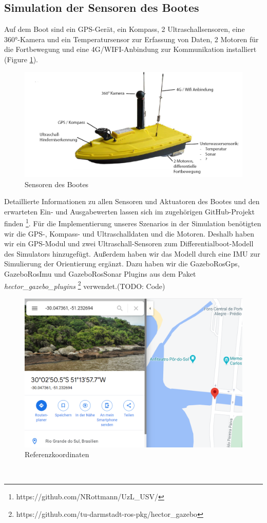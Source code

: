 \documentclass[conference]{IEEEtran}
\begin{document}
\subsection{Simulation der Sensoren des Bootes}
Auf dem Boot sind ein GPS-Gerät, ein Kompass, 2 Ultraschallsensoren, eine 360°-Kamera und ein Temperatursensor zur Erfassung von Daten, 2 Motoren für die Fortbewegung und eine 4G/WIFI-Anbindung zur Kommunikation installiert (Figure \ref{boot}).\\
\begin{figure}
	\includegraphics[width=\linewidth]{boot.png}
	\caption{Sensoren des Bootes}
	\label{boot}
\end{figure}
Detaillierte Informationen zu allen Sensoren und Aktuatoren des Bootes und den erwarteten Ein- und Ausgabewerten lassen sich im zugehörigen GitHub-Projekt finden \footnote{https://github.com/NRottmann/UzL\_USV/}.
Für die Implementierung unseres Szenarios in der Simulation benötigten wir die GPS-, Kompass- und Ultraschalldaten und die Motoren. Deshalb haben wir ein GPS-Modul und zwei Ultraschall-Sensoren zum Differentialboot-Modell des Simulators hinzugefügt. Außerdem haben wir das Modell durch eine IMU zur Simulierung der Orientierung ergänzt. Dazu haben wir die GazeboRosGps, GazeboRosImu und GazeboRosSonar Plugins aus dem Paket \textit{hector\_gazebo\_plugins}  \footnote{https://github.com/tu-darmstadt-ros-pkg/hector\_gazebo} verwendet.(TODO: Code)\\
\begin{figure}
	\includegraphics[width=\linewidth]{reference.png}
	\caption{Referenzkoordinaten}
	\label{reference}
\end{figure}\\
\end{document}
